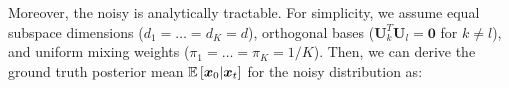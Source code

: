 Moreover, the noisy \MoLRG\; is analytically tractable. For simplicity, we assume equal subspace dimensions ($d_1 = \dots = d_K = d$), orthogonal bases ($\bm U_k^{T} \bm U_l = \bm 0$ for $k \neq l$), and uniform mixing weights ($\pi_1 = \dots = \pi_K = 1/K$). Then, we can derive the ground truth posterior mean $\operatorname{\mathbb{E}}\left[\bm x_0 \vert \bm x_t\right]$ for the noisy \MoLRG\; distribution as:






